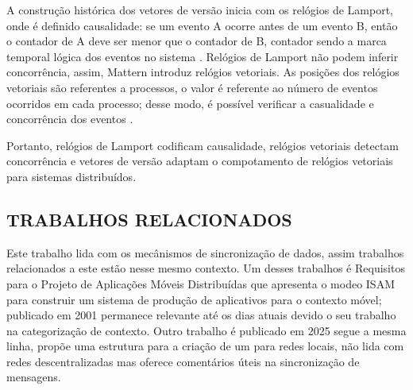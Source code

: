 A construção histórica dos vetores de versão inicia com os relógios de Lamport, onde é definido causalidade: se um evento A ocorre antes de um evento B, então o contador de A deve ser menor que o contador de B, contador sendo a marca temporal lógica dos eventos no sistema \cite{lamport1978time}. Relógios de Lamport não podem inferir concorrência, assim, Mattern introduz relógios vetoriais. As posições dos relógios vetoriais são referentes a processos, o valor é referente ao número de eventos ocorridos em cada processo; desse modo, é possível verificar a casualidade e concorrência dos eventos \cite{mattern1989virtual}. 

Portanto, relógios de Lamport codificam causalidade, relógios vetoriais detectam concorrência e vetores de versão adaptam o compotamento de relógios vetoriais para sistemas distribuídos.

\subsection{TRABALHOS RELACIONADOS}

Este trabalho lida com os mecânismos de sincronização de dados, assim trabalhos relacionados a este estão nesse mesmo contexto. Um desses trabalhos é Requisitos para o Projeto de
Aplicações Móveis Distribuídas \cite{AugustinYaminGeyerBarbosa2001RequisitosAplicacoesMoveisDistribuidas} que apresenta o modeo ISAM para construir um sistema de produção de aplicativos para o contexto móvel; publicado em 2001 permanece relevante até os dias atuais devido o seu trabalho na categorização de contexto. Outro trabalho é  \cite{Guda2025OfflineFirstAndroidChat} publicado em 2025 segue a mesma linha, propõe uma estrutura para a criação de um  para redes locais, não lida com redes descentralizadas mas oferece comentários úteis na sincronização de mensagens. 
